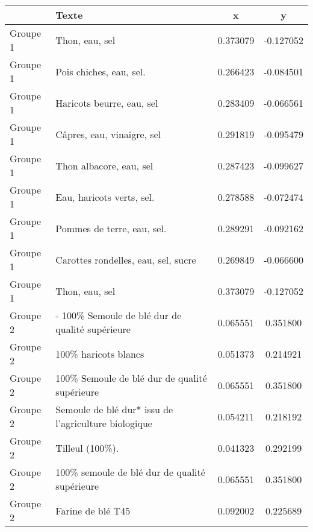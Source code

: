 \begin{tabular}{lp{9cm}cc}
\toprule
{} &                                                                Texte &         x &         y \\
\midrule
Groupe 1 &                                                       Thon, eau, sel &  0.373079 & -0.127052 \\
Groupe 1 &                                              Pois chiches, eau, sel. &  0.266423 & -0.084501 \\
Groupe 1 &                                            Haricots beurre, eau, sel &  0.283409 & -0.066561 \\
Groupe 1 &                                           Câpres, eau, vinaigre, sel &  0.291819 & -0.095479 \\
Groupe 1 &                                              Thon albacore, eau, sel &  0.287423 & -0.099627 \\
Groupe 1 &                                            Eau, haricots verts, sel. &  0.278588 & -0.072474 \\
Groupe 1 &                                           Pommes de terre, eau, sel. &  0.289291 & -0.092162 \\
Groupe 1 &                                  Carottes rondelles, eau, sel, sucre &  0.269849 & -0.066600 \\
Groupe 1 &                                                       Thon, eau, sel &  0.373079 & -0.127052 \\
\midrule    
Groupe 2 &                      - 100\% Semoule de blé dur de qualité supérieure &  0.065551 &  0.351800 \\
Groupe 2 &                                                 100\% haricots blancs &  0.051373 &  0.214921 \\
Groupe 2 &                        100\% Semoule de blé dur de qualité supérieure &  0.065551 &  0.351800 \\
Groupe 2 &               Semoule de blé dur* \newline *issu de l'agriculture biologique &  0.054211 &  0.218192 \\
Groupe 2 &                                                      Tilleul (100\%). &  0.041323 &  0.292199 \\
Groupe 2 &                        100\% semoule de blé dur de qualité supérieure &  0.065551 &  0.351800 \\
Groupe 2 &                                                    Farine de blé T45 &  0.092002 &  0.225689 \\

\end{tabular}
